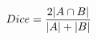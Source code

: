 \documentclass[preview]{standalone}
\begin{document}
\begin{align*}
\special{dvisvgm:raw <g id='unique000'>}Dice = \frac{2|A \cap B|}{|A| + |B|}\special{dvisvgm:raw </g>}
\end{align*}
\end{document}
